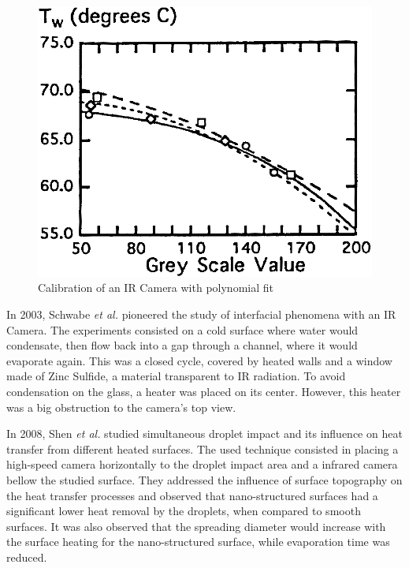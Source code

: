 \begin{figure}
\centering
\includegraphics[width=0.5\linewidth]{Figures/1.Chapter/sargent.png}
\caption{Calibration of an IR Camera with polynomial fit}
\label{fig:sargent} 
\end{figure}

\par In 2003, Schwabe \textit{et al.} \cite{schwabe2003oscillatory} pioneered the study of interfacial phenomena with an IR Camera. The experiments consisted on a cold surface where water would condensate, then flow back into a gap through a channel, where it would evaporate again. This was a closed cycle, covered by heated walls and a window made of Zinc Sulfide, a material transparent to IR radiation. To avoid condensation on the glass, a heater was placed on its center. However, this heater was a big obstruction to the camera's top view. \\


\par In 2008, Shen \textit{et al.} \cite{shen2010simultaneous} studied simultaneous droplet impact and its influence on heat transfer from different heated surfaces. The used technique consisted in placing a high-speed camera horizontally to the droplet impact area and a infrared camera bellow the studied surface. They addressed the influence of surface topography on the heat transfer processes and observed that nano-structured surfaces had a significant lower heat removal by the droplets, when compared to smooth surfaces. It was also observed that the spreading diameter would increase with the surface heating for the nano-structured surface, while evaporation time was reduced.\\


